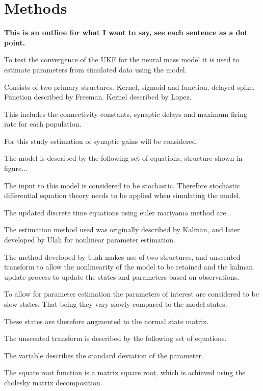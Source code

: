 \section{Methods}

\textbf{This is an outline for what I want to say, see each sentence as a dot point.}

To test the convergence of the UKF for the neural mass model it is used to estimate parameters from simulated data using the model.

	Consists of two primary structures. Kernel, sigmoid and function, delayed spike.
	Function described by Freeman. Kernel described by Lopez. 

	This includes the connectivity constants, synaptic delays and maximum firing rate for each population.

For this study estimation of synaptic gains will be considered.

The model is described by the following set of equations, structure shown in figure...

The input to this model is considered to be stochastic. Therefore stochastic differential equation theory needs to be applied when simulating the model.

The updated discrete time equations using euler mariyama method are...

The estimation method used was originally described by Kalman, and later developed by Ulah for nonlinear parameter estimation.

The method developed by Ulah makes use of two structures, and unscented transform to allow the nonlinearity of the model to be retained and the kalman update process to update the states and parameters based on observations.

To allow for parameter estimation the parameters of interest are considered to be slow states. That being they vary slowly compared to the model states.

These states are therefore augmented to the normal state matrix.

The unscented transform is described by the following set of equations.

The variable describes the standard deviation of the parameter.

The square root function is a matrix square root, which is achieved using the cholesky matrix decomposition.

